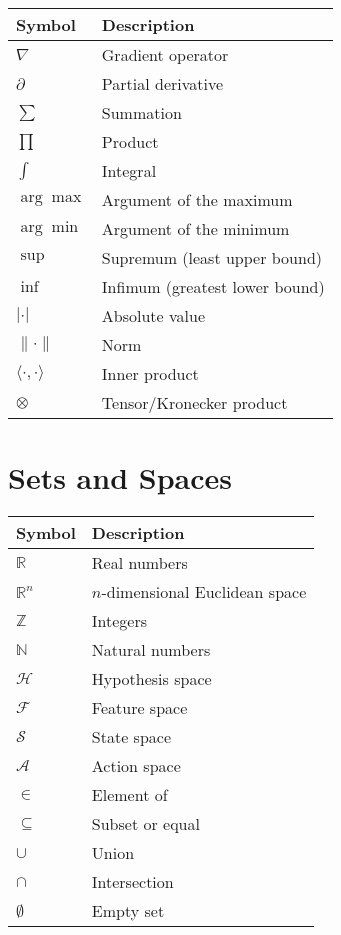 \begin{tabular}{ll}
\toprule
\textbf{Symbol} & \textbf{Description} \\
\midrule
$\nabla$ & Gradient operator \\
$\partial$ & Partial derivative \\
$\sum$ & Summation \\
$\prod$ & Product \\
$\int$ & Integral \\
$\arg\max$ & Argument of the maximum \\
$\arg\min$ & Argument of the minimum \\
$\sup$ & Supremum (least upper bound) \\
$\inf$ & Infimum (greatest lower bound) \\
$|\cdot|$ & Absolute value \\
$\|\cdot\|$ & Norm \\
$\langle \cdot, \cdot \rangle$ & Inner product \\
$\otimes$ & Tensor/Kronecker product \\
\bottomrule
\end{tabular}

\section*{Sets and Spaces}

\begin{tabular}{ll}
\toprule
\textbf{Symbol} & \textbf{Description} \\
\midrule
$\mathbb{R}$ & Real numbers \\
$\mathbb{R}^n$ & $n$-dimensional Euclidean space \\
$\mathbb{Z}$ & Integers \\
$\mathbb{N}$ & Natural numbers \\
$\mathcal{H}$ & Hypothesis space \\
$\mathcal{F}$ & Feature space \\
$\mathcal{S}$ & State space \\
$\mathcal{A}$ & Action space \\
$\in$ & Element of \\
$\subseteq$ & Subset or equal \\
$\cup$ & Union \\
$\cap$ & Intersection \\
$\emptyset$ & Empty set \\
\bottomrule
\end{tabular}

